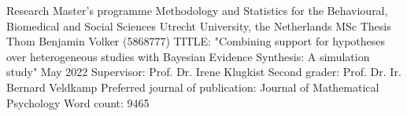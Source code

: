 \documentclass[review, 3p, authoryear]{elsarticle} %
\begin{document}
\thispagestyle{empty}

\begin{large}
\noindent Research Master's programme 
Methodology and Statistics for the Behavioural, Biomedical and Social Sciences \newline
Utrecht University, the Netherlands \newline
\newline
\newline
\newline
\newline
MSc Thesis Thom Benjamin Volker (5868777) 
\newline
TITLE: "Combining support for hypotheses over heterogeneous studies with Bayesian Evidence Synthesis: A simulation study" 
\newline
May 2022 
\newline
\newline
\newline
\newline
\newline
Supervisor:\newline
Prof. Dr. Irene Klugkist \newline
\newline
\newline
Second grader: \newline
Prof. Dr. Ir. Bernard Veldkamp
\newline
\newline
\newline
\newline
Preferred journal of publication: Journal of Mathematical Psychology 
\newline
Word count: 9465
\newline
\end{large}
\addtocounter{page}{-1}
\clearpage
\pagebreak
\end{document}
